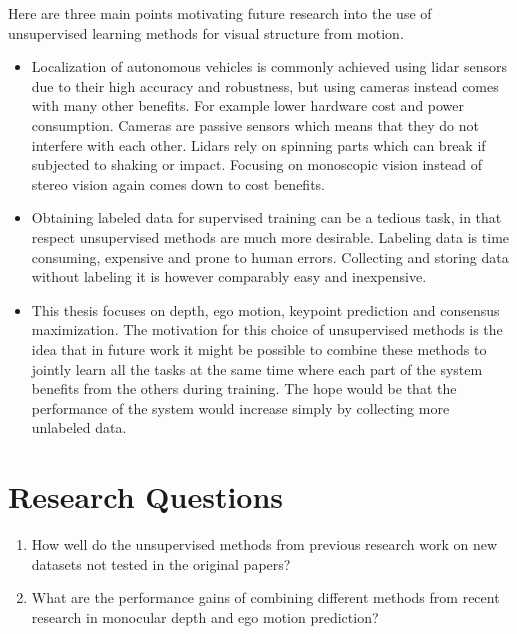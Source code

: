 Here are three main points motivating future research into the use of unsupervised learning methods for visual structure from motion.


\begin{itemize}
	\item Localization of autonomous vehicles is commonly  achieved using lidar sensors due to their high accuracy and robustness, but using cameras instead comes with many other benefits\cite{lidarvscamera}. For example lower hardware cost and power consumption. Cameras are passive sensors which means that they do not interfere with each other. Lidars rely on spinning parts which can break if subjected to shaking or impact. Focusing on monoscopic vision instead of stereo vision again comes down to cost benefits.
	
	\item Obtaining labeled data for supervised training can be a tedious task, in that respect unsupervised methods are much more desirable. Labeling data is time consuming, expensive and prone to human errors. Collecting and storing data without labeling it is however comparably easy and inexpensive.
	
	\item This thesis focuses on depth, ego motion, keypoint prediction and consensus maximization. The motivation for this choice of unsupervised methods is the idea that in future work it might be possible to combine these methods to jointly learn all the tasks at the same time where each part of the system benefits from the others during training. The hope would be that the performance of the system would increase simply by collecting more unlabeled data.
\end{itemize}

\section{Research Questions}

\begin{enumerate}
	
	\item How well do the unsupervised methods from previous research work on new datasets not tested in the original papers?
	
	\item What are the performance gains of combining different methods from recent research in monocular depth and ego motion prediction?
	
\end{enumerate}

